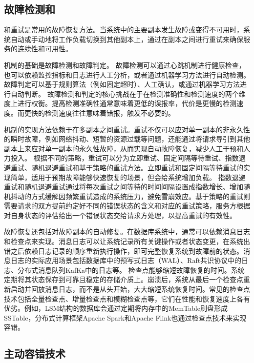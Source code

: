 \subsection{故障检测和\failover }

\failover 和重试是常用的故障恢复方法。当系统中的主要副本发生故障或变得不可用时，系统自动或手动地将工作负载切换到其他副本上，通过在副本之间进行重试来确保服务的连续性和可用性。

\failover 机制的基础是故障检测和故障判定。
故障检测可以通过心跳机制进行健康检查，也可以依赖监控指标和日志进行人工分析，或者通过机器学习方法进行自动检测。故障判定可以基于规则算法（例如固定超时）、人工确认，或通过机器学习方法进行自动判断。
故障检测和判定的核心挑战在于在检测准确性和检测速度的两个维度上进行权衡。提高检测准确性通常意味着更低的误报率，代价是更慢的检测速度。而更快的检测速度往往意味着错报，触发不必要的\failover 。

\failover 机制的实现方法依赖于在多副本之间重试。重试不仅可以应对单一副本的非永久性的瞬时故障，例如网络抖动、短暂的资源过载等问题，还能通过将请求导引到其他副本上来应对单一副本的永久性故障，从而实现自动故障恢复，减少人工干预和人力投入。
根据不同的策略，重试可以分为立即重试、固定间隔等待重试、指数退避重试、随机退避重试和基于策略的重试方法。立即重试和固定间隔等待重试的实现简单，适用于预期故障能够快速恢复的场景，但会给系统增加负载。
指数退避重试和随机退避重试通过将每次重试之间等待的时间间隔设置成指数增长、增加随机抖动的方式缓解因频繁重试造成的系统压力，避免雪崩效应。基于策略的重试则需要请求的双方提前约定好不同的错误状态的含义和对应的重试策略，服务方根据对自身状态的评估给出一个错误状态交给请求方处理，以提高重试的有效性。

故障恢复还包括对故障副本的自动修复。在数据库系统中，通常可以依赖消息日志和检查点来实现。消息日志可以让系统记录所有关键操作或者状态变更，在系统出错之后依赖日志记录的顺序重新执行操作，即可完整恢复系统到故障前的状态。消息日志的实际应用场景包括数据库中的预写式日志（WAL）、Raft共识协议中的日志、分布式消息队列KafKa中的日志等。
检查点能够缩短故障恢复的时间。系统定期将其状态保存到可靠且稳定的存储介质上。崩溃后，系统从最后一个检查点重新启动并回放消息日志，而不是从头开始，大大缩短系统恢复时间。常见的检查点技术包括全量检查点、增量检查点和模糊检查点等，它们在性能和恢复速度上各有优劣。例如，LSM结构\cite{o1996lsmtree}的数据库会通过定期将内存中的MemTable刷盘形成SSTable，分布式计算框架Apache Spark\cite{zaharia2016spark}和Apache Flink\cite{carbone2015flink}也通过检查点技术来实现容错。

\subsection{主动容错技术}

